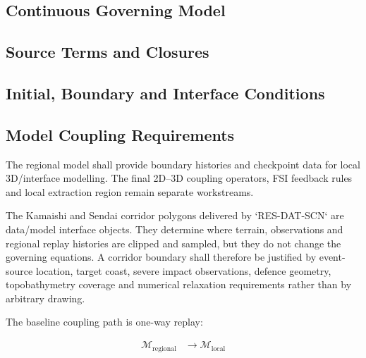 
\subsection{Continuous Governing Model}
\label{sec:res-mod-sys-continuous-governing-model}


\subsection{Source Terms and Closures}
\label{sec:res-mod-sys-source-terms-closures}


\subsection{Initial, Boundary and Interface Conditions}
\label{sec:res-mod-sys-initial-boundary-interface-conditions}


\subsection{Model Coupling Requirements}
\label{sec:res-mod-sys-model-coupling-requirements}

The regional model shall provide boundary histories and checkpoint data
for local 3D/interface modelling. The final 2D--3D coupling operators,
FSI feedback rules and local extraction region remain separate
workstreams.

The Kamaishi and Sendai corridor polygons delivered by `RES-DAT-SCN`
are data/model interface objects. They determine where terrain,
observations and regional replay histories are clipped and sampled, but
they do not change the governing equations. A corridor boundary shall
therefore be justified by event-source location, target coast, severe
impact observations, defence geometry, topobathymetry coverage and
numerical relaxation requirements rather than by arbitrary drawing.

The baseline coupling path is one-way replay:

\begin{align}
  \mathcal{M}_{\mathrm{regional}}
  &\rightarrow
  \mathcal{M}_{\mathrm{local}}
  \label{eq:res-mod-sys-one-way-replay}
\end{align}

